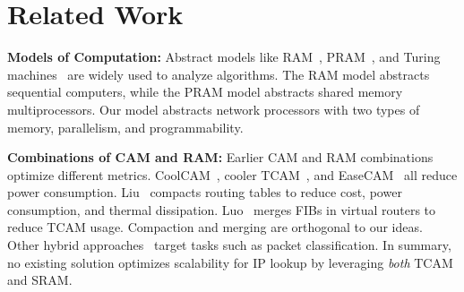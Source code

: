 \section{Related Work}
\label{sec:related}

\textbf{Models of Computation:} Abstract models like RAM~\cite{ram}, PRAM~\cite{pram}, and Turing machines~\cite{models_of_computation} are widely used to analyze algorithms. The RAM model abstracts sequential computers, while the PRAM model abstracts shared memory multiprocessors. Our \cram model abstracts network processors with two types of memory, parallelism, and programmability.

\textbf{Combinations of CAM and RAM:} Earlier CAM and RAM combinations optimize different metrics. CoolCAM~\cite{coolcam}, cooler TCAM~\cite{coolertcam}, and EaseCAM~\cite{easecam} all reduce power consumption. Liu~\cite{liu} compacts routing tables to reduce cost, power consumption, and thermal dissipation. Luo~\cite{virtual_routers} merges FIBs in virtual routers to reduce TCAM usage. Compaction and merging are orthogonal to our ideas. Other hybrid approaches~\cite{magictcam, extendedtcam, portcatcher, treecam} target tasks such as packet classification. In summary, no existing solution optimizes scalability for IP lookup by leveraging {\em both} TCAM and SRAM.